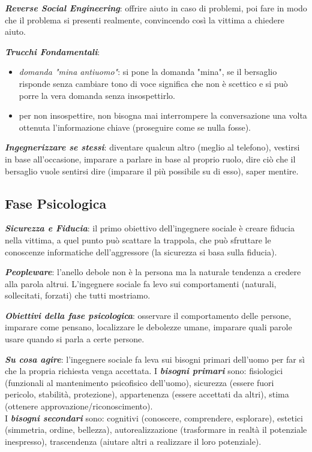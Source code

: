 \documentclass[a4paper, notitlepage, 9pt]{extreport}
\begin{document}
\noindent
\textit{\textbf{Reverse Social Engineering}}: offrire aiuto in caso di problemi, poi fare in modo che il problema si presenti realmente, convincendo così la vittima a chiedere aiuto.
\newline

\noindent
\textit{\textbf{Trucchi Fondamentali}}:
\begin{itemize}
	\item \textit{domanda "mina antiuomo"}: si pone la domanda "mina", se il bersaglio risponde senza cambiare tono di voce significa che non è scettico e si può porre la vera domanda senza insospettirlo.
	\item per non insospettire, non bisogna mai interrompere la conversazione una volta ottenuta l'informazione chiave (proseguire come se nulla fosse).
\end{itemize}
\textit{\textbf{Ingegnerizzare se stessi}}: diventare qualcun altro (meglio al telefono), vestirsi in base all'occasione, imparare a parlare in base al proprio ruolo, dire ciò che il bersaglio vuole sentirsi dire (imparare il più possibile su di esso), saper mentire.

\subsection*{Fase Psicologica}
\textit{\textbf{Sicurezza e Fiducia}}: il primo obiettivo dell'ingegnere sociale è creare fiducia nella vittima, a quel punto può scattare la trappola, che può sfruttare le conoscenze informatiche dell'aggressore (la sicurezza si basa sulla fiducia).

\noindent
\textit{\textbf{Peopleware}}: l'anello debole non è la persona ma la naturale tendenza a credere alla parola altrui. L'ingegnere sociale fa levo sui comportamenti (naturali, sollecitati, forzati) che tutti mostriamo.

\noindent
\textit{\textbf{Obiettivi della fase psicologica}}: osservare il comportamento delle persone, imparare come pensano, localizzare le debolezze umane, imparare quali parole usare quando si parla a certe persone.

\noindent
\textit{\textbf{Su cosa agire}}: l'ingegnere sociale fa leva sui bisogni primari dell’uomo per far sì che la propria richiesta venga accettata. I \textit{\textbf{bisogni primari}} sono: fisiologici (funzionali al mantenimento psicofisico dell’uomo), sicurezza (essere fuori pericolo, stabilità, protezione), appartenenza (essere accettati da altri), stima (ottenere approvazione/riconoscimento).\\
I \textit{\textbf{bisogni secondari}} sono: cognitivi (conoscere, comprendere, esplorare), estetici (simmetria, ordine, bellezza), autorealizzazione (trasformare in realtà il potenziale inespresso), trascendenza (aiutare altri a realizzare il loro potenziale).
\end{document}
